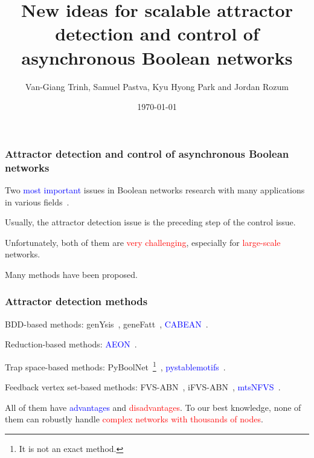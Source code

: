 \documentclass{beamer}              %
\title{New ideas for scalable attractor detection and control of asynchronous Boolean networks}
\author[Van-Giang Trinh]{Van-Giang Trinh\inst{1}, Samuel Pastva\inst{2}, Kyu Hyong Park\inst{3} and Jordan Rozum\inst{4}}
\date{\today}
\institute[] %
{
  \inst{1}
  LIS, Aix-Marseille University, France
  
  \inst{2}
  Institute of Science and Technology, Austria
  
  \inst{3}
  Pennsylvania State University, United States of America
  
  \inst{4}
  Binghamton University, United States of America
}
\newcommand{\blue}[1]{\textcolor{blue}{#1}}
\newcommand{\red}[1]{\textcolor{red}{#1}}
\begin{document}
\begin{frame}
  \titlepage
\end{frame}

\begin{frame}
  \frametitle{Attractor detection and control of asynchronous Boolean networks}

Two \blue{most important} issues in Boolean networks research with many applications in various fields~\cite{akutsu2018algorithms, schwab2020concepts}.

\hspace{0.8cm}

Usually, the attractor detection issue is the preceding step of the control issue.

\hspace{0.8cm}

Unfortunately, both of them are \red{very challenging}, especially for \red{large-scale} networks.

\hspace{0.8cm}

Many methods have been proposed.

\end{frame}

\begin{frame}
  \frametitle{Attractor detection methods}

BDD-based methods: genYsis~\cite{DBLP:journals/bioinformatics/GargCXMM08}, geneFatt~\cite{zheng2013efficient}, \blue{CABEAN}~\cite{DBLP:journals/tcbb/MizeraP0Y19, DBLP:conf/fm/SuP21}.

\hspace{0.8cm}

Reduction-based methods: \blue{AEON}~\cite{DBLP:conf/cav/BenesBPS21}.

\hspace{0.8cm}

Trap space-based methods: PyBoolNet~\footnote{It is not an exact method.}~\cite{klarner2017pyboolnet}, \blue{pystablemotifs}~\cite{Rozum2021, rozum2021pystablemotifs}.

\hspace{0.8cm}

Feedback vertex set-based methods: FVS-ABN~\cite{GiangTCBB2020}, iFVS-ABN~\cite{DBLP:conf/cibcb/GiangH21}, \blue{mtsNFVS}~\cite{DBLP:conf/bcb/TrinhHB22}.

\hspace{0.8cm}

All of them have \blue{advantages} and \red{disadvantages}.
To our best knowledge, none of them can robustly handle \red{complex networks with thousands of nodes}.

\end{frame}
\end{document}
